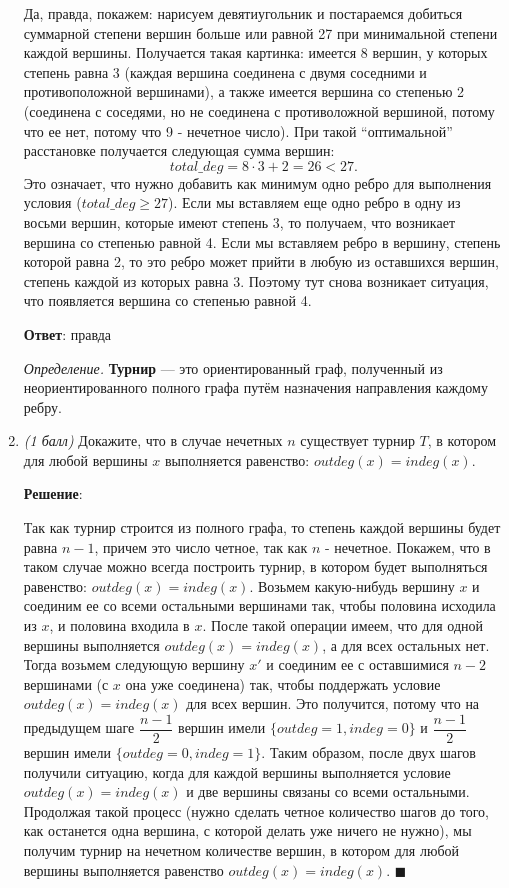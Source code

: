 \documentclass{article}
\begin{document}
\begin{enumerate}
    Да, правда, покажем: нарисуем девятиугольник и постараемся добиться суммарной степени вершин больше или равной 27 при минимальной степени каждой вершины. Получается такая картинка: имеется 8 вершин, у которых степень равна 3 (каждая вершина соединена с двумя соседними и противоположной вершинами), а также имеется вершина со степенью 2 (соединена с соседями, но не соединена с противоложной вершиной, потому что ее нет, потому что 9 - нечетное число). При такой ``оптимальной'' расстановке получается следующая сумма вершин:
    \begin{equation}
        total\_deg = 8 \cdot 3 + 2 = 26 < 27.
    \end{equation}
    Это означает, что нужно добавить как минимум одно ребро для выполнения условия ($total\_deg \geq 27$). Если мы вставляем еще одно ребро в одну из восьми вершин, которые имеют степень 3, то получаем, что возникает вершина со степенью равной 4. Если мы вставляем ребро в вершину, степень которой равна 2, то это ребро может прийти в любую из оставшихся вершин, степень каждой из которых равна 3. Поэтому тут снова возникает ситуация, что появляется вершина со степенью равной 4.

    \textbf{Ответ}:
    правда
    
    \textit{Определение.} \textbf{Турнир} --- это ориентированный граф, полученный из неориентированного полного графа путём назначения направления каждому ребру.
    
    \item \textit{(1 балл)} Докажите, что в случае нечетных $n$ существует турнир $T$, в котором для любой вершины $x$ выполняется равенство: $outdeg(x) = indeg(x)$.
    
    \textbf{Решение}:

    Так как турнир строится из полного графа, то степень каждой вершины будет равна $n-1$, причем это число четное, так как $n$ - нечетное. Покажем, что в таком случае можно всегда построить турнир, в котором будет выполняться равенство: $outdeg(x) = indeg(x)$. Возьмем какую-нибудь вершину $x$ и соединим ее со всеми остальными вершинами так, чтобы половина исходила из $x$, и половина входила в $x$. После такой операции имеем, что для одной вершины выполняется $outdeg(x) = indeg(x)$, а для всех остальных нет. Тогда возьмем следующую вершину $x'$ и соединим ее с оставшимися $n-2$ вершинами (с $x$ она уже соединена) так, чтобы поддержать условие $outdeg(x) = indeg(x)$ для всех вершин. Это получится, потому что на предыдущем шаге $\dfrac{n-1}{2}$ вершин имели $\{outdeg = 1, indeg = 0\}$ и $\dfrac{n-1}{2}$ вершин имели $\{outdeg = 0, indeg = 1\}$. Таким образом, после двух шагов получили ситуацию, когда для каждой вершины выполняется условие $outdeg(x) = indeg(x)$ и две вершины связаны со всеми остальными. Продолжая такой процесс (нужно сделать четное количество шагов до того, как останется одна вершина, с которой делать уже ничего не нужно), мы получим турнир на нечетном количестве вершин, в котором для любой вершины выполняется равенство $outdeg(x) = indeg(x)$. $\blacksquare$
    

\end{enumerate}
\end{document}
